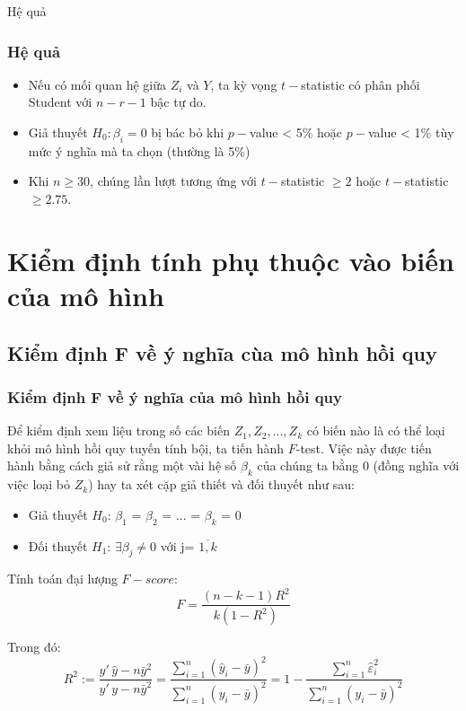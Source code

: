 \begin{frame}
\begin{block}{Hệ quả}
\frametitle{Hệ quả}
\begin{itemize}
\item Nếu có mối quan hệ giữa $Z_i$ và $Y$, ta kỳ vọng $t-$statistic có phân phối Student với $n-r-1$ bậc tự do.
\item Giả thuyết $H_0: \beta_i = 0$ bị bác bỏ khi $p-$value < 5\% hoặc $p-$value < 1\% tùy mức ý nghĩa mà ta chọn (thường là 5\%)
\item Khi $ n \ge 30$, chúng lần lượt tương ứng với $t-$statistic $\ge 2$ hoặc $t-$statistic $\ge 2.75$.
\end{itemize}
\end{block}
\end{frame}
\section{Kiểm định tính phụ thuộc vào biến của mô hình}
\subsection{Kiểm định F về ý nghĩa cùa mô hình hồi quy}
\begin{frame}
\frametitle{Kiểm định F về ý nghĩa của mô hình hồi quy}
Để kiểm định xem liệu trong số các biến $Z_1,Z_2,...,Z_k$ có biến nào là có thể loại khỏi mô hình hồi quy tuyến tính bội, ta tiến hành $F$-test. Việc này được tiến hành bằng cách giả sử rằng một vài hệ số $\beta_k$ của chúng ta bằng 0 (đồng nghĩa với việc loại bỏ $Z_k$) hay ta xét cặp giả thiết và đối thuyết như sau:
\begin{itemize}
    \item Giả thuyết $H_0$: $\beta_1$ =  $\beta_2$ = ... =  $\beta_k$ = 0
    \item Đối thuyết $H_1$: $\exists\beta_j \neq 0$ với j= $\overline{1,k}$ 
\end{itemize}

Tính toán đại lượng $F - score$:
\begin{equation*}
	F = \dfrac{(n-k-1)R^2}{k(1-R^2)}
\end{equation*}

Trong đó:
\[
R^{2} := 
\dfrac{\widehat{y}'\,\widehat{y} - n\bar{y}^{2}}
      {y'\,y - n\bar{y}^{2}}
= 
\dfrac{\displaystyle\sum_{i=1}^{n} (\widehat{y}_{i} - \bar{y})^{2}}
      {\displaystyle\sum_{i=1}^{n} (y_{i} - \bar{y})^{2}}
= 
1 - 
\dfrac{\displaystyle\sum_{i=1}^{n} \widehat{\varepsilon}_{i}^{2}}
      {\displaystyle\sum_{i=1}^{n} (y_{i} - \bar{y})^{2}}
\] 
\end{frame}
